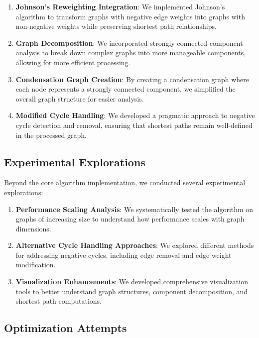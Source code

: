 \documentclass[11pt]{article}
\begin{document}
\begin{enumerate}
    \item \textbf{Johnson's Reweighting Integration}: We implemented Johnson's algorithm to transform graphs with negative edge weights into graphs with non-negative weights while preserving shortest path relationships.
    
    \item \textbf{Graph Decomposition}: We incorporated strongly connected component analysis to break down complex graphs into more manageable components, allowing for more efficient processing.
    
    \item \textbf{Condensation Graph Creation}: By creating a condensation graph where each node represents a strongly connected component, we simplified the overall graph structure for easier analysis.
    
    \item \textbf{Modified Cycle Handling}: We developed a pragmatic approach to negative cycle detection and removal, ensuring that shortest paths remain well-defined in the processed graph.
\end{enumerate}

\subsection{Experimental Explorations}

Beyond the core algorithm implementation, we conducted several experimental explorations:

\begin{enumerate}
    \item \textbf{Performance Scaling Analysis}: We systematically tested the algorithm on graphs of increasing size to understand how performance scales with graph dimensions.
    
    \item \textbf{Alternative Cycle Handling Approaches}: We explored different methods for addressing negative cycles, including edge removal and edge weight modification.
    
    \item \textbf{Visualization Enhancements}: We developed comprehensive visualization tools to better understand graph structures, component decomposition, and shortest path computations.
\end{enumerate}

\subsection{Optimization Attempts}
\end{document}
